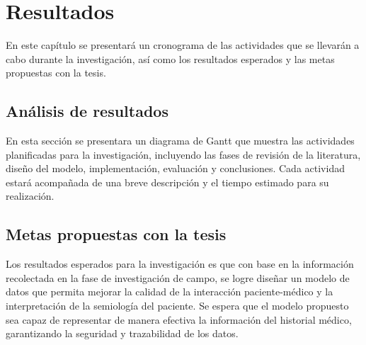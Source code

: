 \section{Resultados}
En este capítulo se presentará un cronograma de las actividades que se llevarán a cabo durante la investigación, así como los resultados esperados y las metas propuestas con la tesis.

    \subsection{Análisis de resultados}
    En esta sección se presentara un diagrama de Gantt que muestra las actividades planificadas para la investigación, incluyendo las fases de revisión de la literatura, diseño del modelo, implementación, evaluación y conclusiones. Cada actividad estará acompañada de una breve descripción y el tiempo estimado para su realización.
    \subsection{Metas propuestas con la tesis}
    Los resultados esperados para la investigación es que con base en la información recolectada en la fase de investigación de campo, se logre diseñar un modelo de datos que permita mejorar la calidad de la interacción paciente-médico y la interpretación de la semiología del paciente. Se espera que el modelo propuesto sea capaz de representar de manera efectiva la información del historial médico, garantizando la seguridad y trazabilidad de los datos.